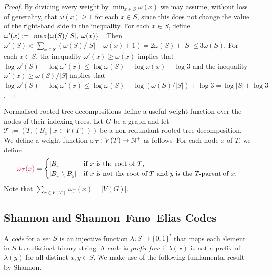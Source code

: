 \documentclass{patmorin}
\makeatletter
\renewcommand{\ge}{\geqslant}
\renewcommand{\le}{\leqslant}
\newcommand{\pat}[1]{\textcolor{Magenta}{PaMo: #1}}
\newcommand{\gwen}[1]{\textcolor{Purple}{GJ: #1}}
\newcommand{\defin}[1]{\emph{\textcolor{brightmaroon}{#1}}}
\def\mathcolor#1#{\@mathcolor{#1}}
\def\@mathcolor#1#2#3{%
  \protect\leavevmode
  \begingroup
    \color#1{#2}#3%
  \endgroup
}
\newcommand{\mathdefin}[1]{\mathcolor{brightmaroon}{#1}}
\DeclarePairedDelimiter{\ceil}{\lceil}{\rceil}
\newcommand{\calT}{\mathcal{T}}
\makeatother
\begin{document}
  \begin{proof}
    By dividing every weight by $\min_{x\in S}\omega(x)$ we may assume, without loss of generality, that $\omega(x)\ge 1$ for each $x\in S$, since this does not change the value of the right-hand side in the inequality. 
    For each $x\in S$, define $\omega'(x):=\ceil{\max\{\omega(S)/|S|,\; \omega(x)\}}$.  Then $\omega'(S)<\sum_{x\in S}(\omega(S)/|S|+\omega(x)+1)= 2\omega(S)+|S|\le 3\omega(S)$.  For each $x\in S$, the inequality $\omega'(x)\ge \omega(x)$ implies that $\log\omega'(S)-\log\omega'(x)\le\log \omega(S)-\log\omega(x)+\log 3$ and the inequality $\omega'(x)\ge \omega(S)/|S|$ implies that $\log\omega'(S)-\log\omega'(x)\le \log\omega(S)-\log(\omega(S)/|S|) + \log 3 = \log|S| + \log 3$.
  \end{proof}

  
  Normalised rooted tree-decompositions define a useful weight function over the nodes of their indexing trees.
  Let $G$ be a graph and let $\calT:=(T,(B_x \mid x\in V(T)))$ be a non-redundant rooted tree-decomposition. 
    We define a weight function $\omega_\calT:V(T)\to \N^+$ as follows. 
      For each node $x$ of $T$, we define    
  \[
      \mathdefin{\omega_{\calT}(x)}=\begin{cases}
      |B_x|&\textrm{if $x$ is the root of $T$,}\\
      |B_x\setminus B_y|&\textrm{if $x$ is not the root of $T$ and $y$ is the $T$-parent of $x$.}
      \end{cases}
  \]
  Note that $\sum_{x\in V(T)}\omega_\calT(x)=|V(G)|$.  

  \subsection{Shannon and Shannon--Fano--Elias Codes}

  A \defin{code} for a set $S$ is an injective function $\lambda:S\to\{0,1\}^*$ that maps each element in $S$ to a distinct binary string.  A code is \defin{prefix-free} if $\lambda(x)$ is not a prefix of $\lambda(y)$ for all distinct $x,y\in S$.
  We make use of the following fundamental result by Shannon.
\end{document}
